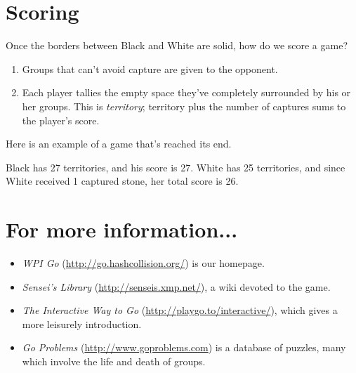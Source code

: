 \documentclass{article}
\begin{document}
\section*{Scoring}

Once the borders between Black and White are solid, how do we score a game?
\begin{enumerate}
\item Groups that can't avoid capture are given to the opponent.

\item Each player tallies the empty space they've completely surrounded
  by his or her groups.  This is \emph{territory}; territory plus the
  number of captures sums to the player's score.
\end{enumerate}
%
Here is an example of a game that's reached its end.
\begin{center}
\hspace{.3in}
\hspace{.3in}
\end{center}
Black has 27 territories, and his score is 27.  White has 25
territories, and since White received 1 captured stone, her total
score is 26.

\section*{For more information...}
\begin{itemize}
\item \emph{WPI Go} (\url{http://go.hashcollision.org/}) is our homepage.

\item \emph{Sensei's Library} (\url{http://senseis.xmp.net/}), a wiki
  devoted to the game.

\item \emph{The Interactive Way to Go}
  (\url{http://playgo.to/interactive/}), which gives a more leisurely
  introduction.

\item \emph{Go Problems}
 (\url{http://www.goproblems.com}) is a database of puzzles, many
  which involve the life and death of groups.

\end{itemize}
\end{document}
